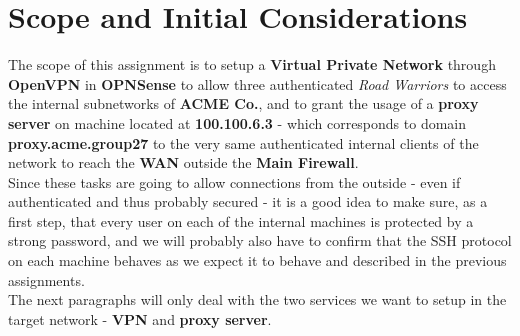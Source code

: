 \section{Scope and Initial Considerations}
The scope of this assignment is to setup a \textbf{Virtual Private Network} through \textbf{OpenVPN} in \textbf{OPNSense} to allow three authenticated \textit{Road Warriors} to access the internal subnetworks of \textbf{ACME Co.}, and to grant the usage of a \textbf{proxy server} on machine located at \textbf{100.100.6.3} -  which corresponds to domain \textbf{proxy.acme.group27} to the very same authenticated internal clients of the network to reach the \textbf{WAN} outside the \textbf{Main Firewall}.\\
Since these tasks are going to allow connections from the outside - even if authenticated and thus probably secured - it is a good idea to make sure, as a first step, that every user on each of the internal machines is protected by a strong password, and we will probably also have to confirm that the SSH protocol on each machine behaves as we expect it to behave and described in the previous assignments.\\
The next paragraphs will only deal with the two services we want to setup in the target network - \textbf{VPN} and \textbf{proxy server}.
